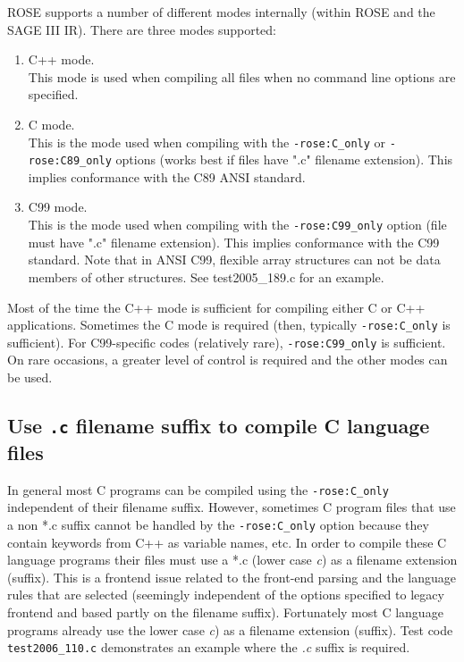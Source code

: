    ROSE supports a number of different modes internally (within ROSE and the SAGE III
IR).  There are three modes supported:
\begin{enumerate}
   \item C++ mode. \\
        This mode is used when compiling all files when no command line options are specified.

   \item C mode. \\
        This is the mode used when compiling with the {\tt -rose:C\_only} or
        {\tt -rose:C89\_only} options (works best if files have ".c" filename extension).
        This implies conformance with the C89 ANSI standard.

   \item C99 mode. \\
        This is the mode used when compiling with the {\tt -rose:C99\_only} option
        (file must have ".c" filename extension). This implies conformance with the
        C99 standard.
   Note that in ANSI C99, flexible array structures can not be data members of 
   other structures. See test2005\_189.c for an example.

\end{enumerate}

  Most of the time the C++ mode is sufficient for compiling either C or C++ 
applications.  Sometimes the C mode is required (then, typically {\tt -rose:C\_only} is
sufficient). For 
C99-specific codes (relatively rare), {\tt -rose:C99\_only} is sufficient.  On rare 
occasions, a greater level of control is required and the other modes can be used.

\subsection{Use {\tt *.c} filename suffix to compile C language files}
In general most C programs can be compiled using the {\tt -rose:C\_only}
independent of their filename suffix. However,
sometimes C program files that use a non *.c suffix cannot be handled by the
{\tt -rose:C\_only} option because they contain keywords from C++ as variable 
names, etc.  In order to compile these C language programs their files must use 
a *.c (lower case {\em c}) as a filename extension (suffix).  This is a frontend
issue related to the front-end parsing and the language rules that are selected
(seemingly independent of the options specified to legacy frontend and based partly on the
filename suffix).  Fortunately most C language programs already use the lower
case {\em c}) as a filename extension (suffix).  Test code {\tt test2006\_110.c}
demonstrates an example where the {\em *.c} suffix is required.

